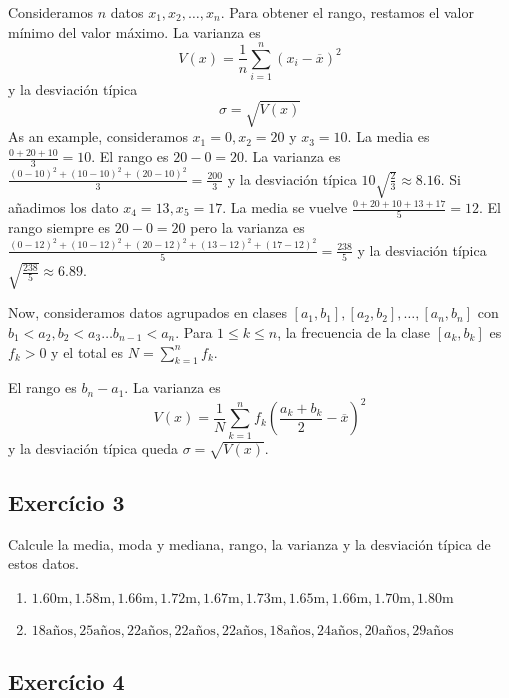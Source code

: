 Consideramos $n$ datos $x_1, x_2, \ldots, x_n$. Para obtener el rango, restamos
el valor mínimo del valor máximo. La varianza es
$$
V(x) =
\frac{1}{n}
\sum_{i=1}^n \left(x_i - \overline{x}\right)^2
$$
y la desviación típica
$$
\sigma = \sqrt{V(x)}
$$
As an example, consideramos $x_1 = 0, x_2 = 20$ y $x_3 = 10$. La media es
$\frac{0+20+10}{3} = 10$. El rango es $20 - 0 = 20$. La varianza es
$\frac{\left(0-10\right)^2 + \left(10-10\right)^2 + \left(20-10\right)^2}{3}
= \frac{200}{3}$ y la desviación típica
$10 \sqrt{\frac{2}{3}} \approx 8.16$. Si
añadimos los dato $x_4 = 13, x_5 = 17$. La media se vuelve
$\frac{0+20+10+13+17}{5} = 12$. El rango siempre es $20 - 0 = 20$ pero
la varianza es
$\frac{\left(0-12\right)^2 + \left(10-12\right)^2 + \left(20-12\right)^2
+ \left(13-12\right)^2 + \left(17-12\right)^2}{5}
= \frac{238}{5}$ y la desviación típica
$\sqrt{\frac{238}{5}} \approx 6.89$.

Now, consideramos datos agrupados en clases
${[a_1, b_1]}, {[a_2, b_2]}, \ldots, {[a_n, b_n]}$ con
$b_1 < a_2, b_2 < a_3 \ldots b_{n-1} < a_n$. Para $1 \leq k \leq n$, la
frecuencia de la clase $[a_k, b_k]$ es $f_k > 0$ y el total es
$N = \sum_{k=1}^n f_k$.

El rango es $b_n - a_1$. La varianza es
$$
V(x) =
\frac{1}{N}
\sum_{k=1}^n f_k \left(\frac{a_k+b_k}{2} - \overline{x}\right)^2
$$
y la desviación típica queda $\sigma = \sqrt{V(x)}$.

\subsection*{Exercício 3}

Calcule la media, moda y mediana, rango, la varianza y la desviación típica
de estos datos.

\begin{enumerate}
\item $1.60\text{m}, 1.58\text{m}, 1.66\text{m}, 1.72\text{m}, 1.67\text{m}, 1.73\text{m}, 1.65\text{m}, 1.66\text{m}, 1.70\text{m}, 1.80\text{m}$
\item $18 \text{años}, 25 \text{años}, 22 \text{años},  \text{22} \text{años},
   \text{22} \text{años},  \text{18} \text{años},
   \text{24} \text{años},  \text{20} \text{años},  \text{29} \text{años}$
\end{enumerate}

\subsection*{Exercício 4}

